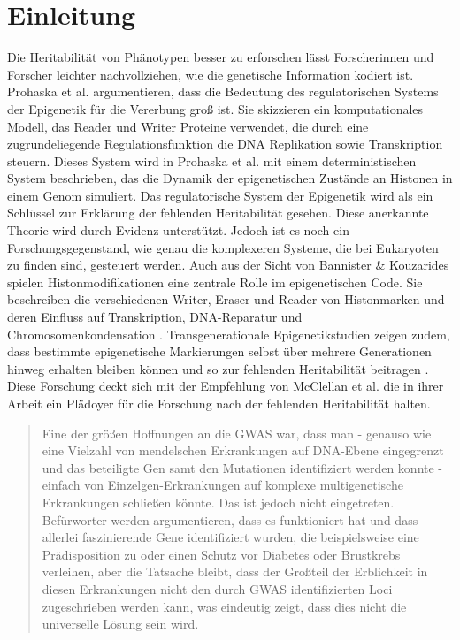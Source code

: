 \documentclass{SeminarV2}
\begin{document}
\section{Einleitung}
Die Heritabilit\"{a}t von Ph\"{a}notypen besser zu erforschen l\"{a}sst Forscherinnen und Forscher leichter
nachvollziehen, wie die genetische Information kodiert ist.
Prohaska et al. argumentieren, dass die Bedeutung des regulatorischen Systems der Epigenetik f\"{u}r die Vererbung gro{\ss} ist.
Sie skizzieren ein komputationales Modell, das Reader und Writer Proteine verwendet, die durch eine zugrundeliegende Regulationsfunktion die DNA Replikation sowie Transkription steuern.
Dieses System wird in Prohaska et al. mit einem deterministischen System beschrieben, das die Dynamik der epigenetischen Zust\"{a}nde an Histonen in einem Genom simuliert.
Das regulatorische System der Epigenetik wird als ein Schlüssel zur Erklärung der fehlenden Heritabilität gesehen.
Diese anerkannte Theorie wird durch Evidenz unterstützt. Jedoch ist es noch ein Forschungsgegenstand, wie genau die komplexeren Systeme, die bei Eukaryoten zu finden sind, gesteuert werden. \cite{prohaska-2010}
Auch aus der Sicht von Bannister {\&} Kouzarides spielen Histonmodifikationen eine zentrale Rolle im epigenetischen Code. 
Sie beschreiben die verschiedenen Writer, Eraser und Reader von Histonmarken und deren Einfluss auf Transkription, DNA-Reparatur und Chromosomenkondensation \cite{bannister-2011}.  
Transgenerationale Epigenetikstudien zeigen zudem, dass bestimmte epigenetische Markierungen selbst \"{u}ber mehrere Generationen hinweg erhalten bleiben k\"{o}nnen und so zur fehlenden Heritabilit\"{a}t beitragen \cite{tollefsbol-2014}.
Diese Forschung deckt sich mit der Empfehlung von McClellan et al.
die in ihrer Arbeit ein Pl\"{a}doyer f\"{u}r die Forschung
nach der fehlenden Heritabilit\"{a}t halten. 

\begin{quote}
  \sloppy
  Eine der gr\"{o}{\ss}en Hoffnungen an die GWAS war, dass man - 
  genauso wie eine Vielzahl von mendelschen Erkrankungen auf DNA-Ebene 
  eingegrenzt und das beteiligte Gen samt den Mutationen identifiziert werden konnte - 
  einfach von Einzelgen-Erkrankungen auf komplexe multigenetische Erkrankungen schlie{\ss}en k\"{o}nnte. 
  Das ist jedoch nicht eingetreten. Bef\"{u}rworter werden argumentieren, dass es funktioniert hat 
  und dass allerlei faszinierende Gene identifiziert wurden, die beispielsweise eine Pr\"{a}disposition 
  zu oder einen Schutz vor Diabetes oder Brustkrebs verleihen, aber die Tatsache bleibt, dass der Gro{\ss}teil 
  der Erblichkeit in diesen Erkrankungen nicht den durch GWAS identifizierten Loci zugeschrieben werden 
  kann, was eindeutig zeigt, dass dies nicht die universelle L\"{o}sung sein wird.
  \cite{mcclellan-2010}
\end{quote}
\end{document}
